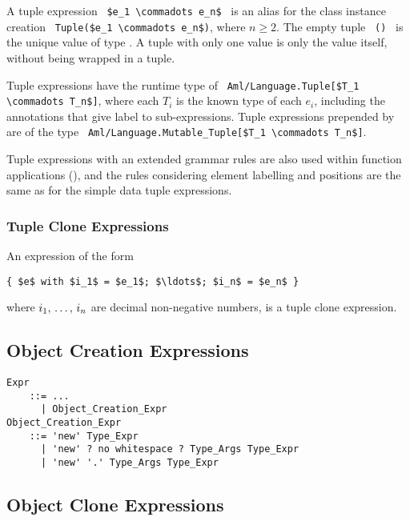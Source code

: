 A tuple expression ~\lstinline!$e_1 \commadots e_n$!~ is an alias for the class instance creation ~\lstinline!Tuple($e_1 \commadots e_n$)!, where $n \geq 2$. The empty tuple ~\lstinline!()!~ is the unique value of type . A tuple with only one value is only the value itself, without being wrapped in a tuple.  

Tuple expressions have the runtime type of ~\lstinline!Aml/Language.Tuple[$T_1 \commadots T_n$]!, where each $T_i$ is the known type of each $e_i$, including the annotations that give label to sub-expressions. Tuple expressions prepended by  are of the type ~\lstinline!Aml/Language.Mutable_Tuple[$T_1 \commadots T_n$]!.

Tuple expressions with an extended grammar rules are also used within function applications (), and the rules considering element labelling and positions are the same as for the simple data tuple expressions. 





\subsubsection{Tuple Clone Expressions}
\label{sec:tuple-clone}

An expression of the form 
\begin{lstlisting}
{ $e$ with $i_1$ = $e_1$; $\ldots$; $i_n$ = $e_n$ }
\end{lstlisting}
where $i_1 ,\, \ldots ,\, i_n$ are decimal non-negative numbers, is a tuple clone expression. 






\subsection{Object Creation Expressions}
\label{sec:object-creation-exprs}

\grammar\begin{lstlisting}[deletekeywords={no}]
Expr
    ::= ...
      | Object_Creation_Expr
Object_Creation_Expr 
    ::= 'new' Type_Expr 
      | 'new' ? no whitespace ? Type_Args Type_Expr 
      | 'new' '.' Type_Args Type_Expr 
\end{lstlisting}







\subsection{Object Clone Expressions}
\label{sec:object-clone-expressions}

